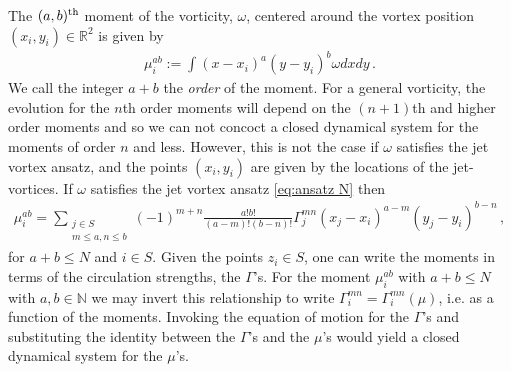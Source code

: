\documentclass[12pt]{amsart}
\newcommand{\R}{\ensuremath{\mathbb{R}}}
\theoremstyle{remark}
\begin{document}
	The $(a,b)^{\rm th}$ moment of the vorticity, $\omega$, centered around the vortex position $(x_i,y_i) \in \R^2$ is given by
	\begin{align*}
		\mu^{ab}_i := \int (x-x_i)^a (y-y_i)^b \omega dxdy\,.
	\end{align*}
	We call the integer $a+b$ the \emph{order} of the moment.
	For a general vorticity, the evolution for the $n$th order moments will depend on the $(n+1)$th and higher order moments
	and so we can not concoct a closed dynamical system for the moments of order $n$ and less.
	However, this is not the case if $\omega$ satisfies the jet vortex ansatz, and the points $(x_i,y_i)$ are given by the locations of the jet-vortices.
	If $\omega$ satisfies the jet vortex ansatz \eqref{eq:ansatz N} then
	\begin{align*}
		\mu^{ab}_i = \sum_{
			\substack{
				j \in S \\
				m \leq a ,
				n \leq b
			}
		}
		(-1)^{m+n} \frac{a! b!}{(a-m)!(b-n)!} \Gamma_j^{mn} (x_j - x_i)^{a-m} (y_j - y_i)^{b-n}\,,
	\end{align*}
	for $a+b \leq N$ and $i \in S$.
	Given the points $z_i \in S$, one can write the moments in terms of the circulation
	strengths, the $\Gamma$'s.
	For the moment $\mu_i^{ab}$ with $a+b \leq N$ with $a,b \in \mathbb{N}$
	we may invert this relationship to write $\Gamma_i^{mn} = \Gamma_i^{mn}( \mu)$, i.e. as a function of the moments.
	Invoking the equation of motion for the $\Gamma$'s and substituting the identity between the $\Gamma$'s
	and the $\mu$'s
	would yield a closed dynamical system for the $\mu$'s.
	
\end{document}
